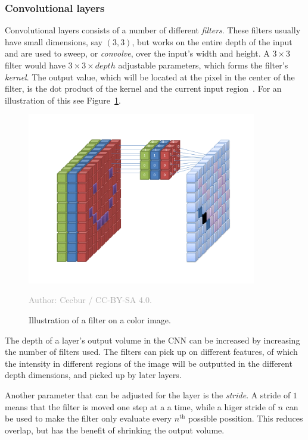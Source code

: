 \documentclass{kththesis}
\newcommand{\source}[1]{\vspace{-5mm}\caption*{\textcolor{darkgray}{Author: {#1}}\vspace{-7mm}} }
\begin{document}
\subsubsection{Convolutional layers}
Convolutional layers consists of a number of different \textit{filters}. These filters usually have small dimensions, say $(3, 3)$, but works on the entire depth of the input and are used to sweep, or \textit{convolve}, over the input's width and height. A $3 \times 3$ filter would have $3 \times 3 \times depth$ adjustable parameters, which forms the filter's \textit{kernel}. The output value, which will be located at the pixel in the center of the filter, is the dot product of the kernel and the current input region~\cite{cnnIntro}. For an illustration of this see Figure~\ref{fig:cnn_color_filter}.

\begin{figure}
  \begin{center}
    \includegraphics[width=100mm]{img/cnn_color_filter.png}
    \caption{Illustration of a filter on a color image.}
    \source{Cecbur / CC-BY-SA 4.0.}
    \label{fig:cnn_color_filter}
  \end{center}
\end{figure}

The depth of a layer's output volume in the CNN can be increased by increasing the number of filters used. The filters can pick up on different features, of which the intensity in different regions of the image will be outputted in the different depth dimensions, and picked up by later layers.

Another parameter that can be adjusted for the layer is the \textit{stride}. A stride of $1$ means that the filter is moved one step at a a time, while a higer stride of $n$ can be used to make the filter only evaluate every $n^{\text{th}}$ possible possition. This reduces overlap, but has the benefit of shrinking the output volume.
\end{document}
